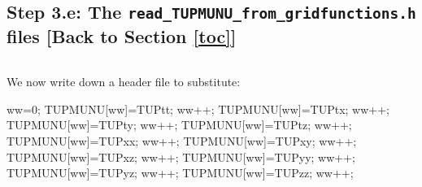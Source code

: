 \documentclass[landscape,letterpaper,10pt,english]{article}
\newenvironment{Shaded}{}{}
\newcommand{\DecValTok}[1]{\textcolor[rgb]{0.25,0.63,0.44}{{#1}}}
\newcommand{\NormalTok}[1]{{#1}}
\begin{document}
    \subsection{\texorpdfstring{Step 3.e: The
\texttt{read\_TUPMUNU\_from\_gridfunctions.h} files {[}Back to
Section \ref{toc}{]}}{Step 3.e: The read\_TUPMUNU\_from\_gridfunctions.h files {[}Back to {]}}}\label{step-3.e-the-read_tupmunu_from_gridfunctions.h-files-back-to-top}

\[\label{read_in_tupmunu}\]

We now write down a header file to substitute:

\begin{Shaded}
\begin{Highlighting}[]
\NormalTok{  ww=}\DecValTok{0}\NormalTok{;}
\NormalTok{  TUPMUNU[ww]=TUPtt; ww++;}
\NormalTok{  TUPMUNU[ww]=TUPtx; ww++;}
\NormalTok{  TUPMUNU[ww]=TUPty; ww++;}
\NormalTok{  TUPMUNU[ww]=TUPtz; ww++;}
\NormalTok{  TUPMUNU[ww]=TUPxx; ww++;}
\NormalTok{  TUPMUNU[ww]=TUPxy; ww++;}
\NormalTok{  TUPMUNU[ww]=TUPxz; ww++;}
\NormalTok{  TUPMUNU[ww]=TUPyy; ww++;}
\NormalTok{  TUPMUNU[ww]=TUPyz; ww++;}
\NormalTok{  TUPMUNU[ww]=TUPzz; ww++;}
\end{Highlighting}
\end{Shaded}
\end{document}
